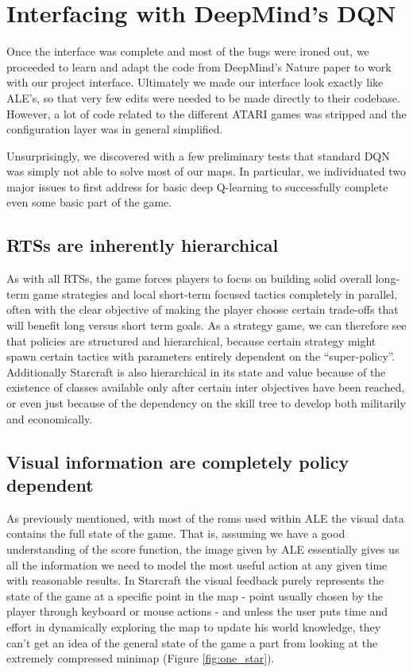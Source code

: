 \documentclass[bsc,frontabs,twoside,parskip,deptreport]{infthesis}     %
\begin{document}
\section{Interfacing with DeepMind's DQN}

Once the interface was complete and most of the bugs were ironed out, we
proceeded to learn and adapt the code from DeepMind's Nature paper to work with
our project interface. Ultimately we made our interface look exactly like ALE's,
so that very few edits were needed to be made directly to their codebase.
However, a lot of code related to the different ATARI games was stripped and the
configuration layer was in general simplified.

Unsurprisingly, we discovered with a few preliminary tests that standard DQN was
simply not able to solve most of our maps. In particular, we individuated two
major issues to first address for basic deep Q-learning to successfully complete
even some basic part of the game.

\subsection{RTSs are inherently hierarchical}

As with all RTSs, the game forces players to focus on building solid overall
long-term game strategies and local short-term focused tactics completely in
parallel, often with the clear objective of making the player choose certain
trade-offs that will benefit long versus short term goals. As a strategy game, we
can therefore see that policies are structured and hierarchical, because certain
strategy might spawn certain tactics with parameters entirely dependent on the
``super-policy''. Additionally Starcraft is also hierarchical in its state and
value because of the existence of classes available only after certain inter
objectives have been reached, or even just because of the dependency on the
skill tree to develop both militarily and economically.

\subsection{Visual information are completely policy dependent}

As previously mentioned, with most of the roms used within ALE the visual data
contains the full state of the game. That is, assuming we have a good
understanding of the score function, the image given by ALE essentially gives us
all the information we need to model the most useful action at any given time
with reasonable results. In Starcraft the visual feedback purely represents the
state of the game at a specific point in the map - point usually chosen by the
player through keyboard or mouse actions - and unless the user puts time and
effort in dynamically exploring the map to update his world knowledge, they
can't get an idea of the general state of the game a part from looking at the
extremely compressed minimap (Figure \ref{fig:one_star}).
\end{document}
